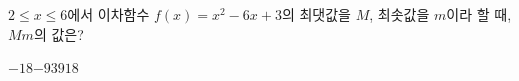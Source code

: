 $2\le x\le 6$에서 이차함수 $f(x)=x^2-6x+3$의 최댓값을 $M$, 최솟값을 $m$이라 할 때, $Mm$의 값은?
\begin{choices32}{$-18$}{$-9$}{$3$}{$9$}{$18$}\end{choices32}
